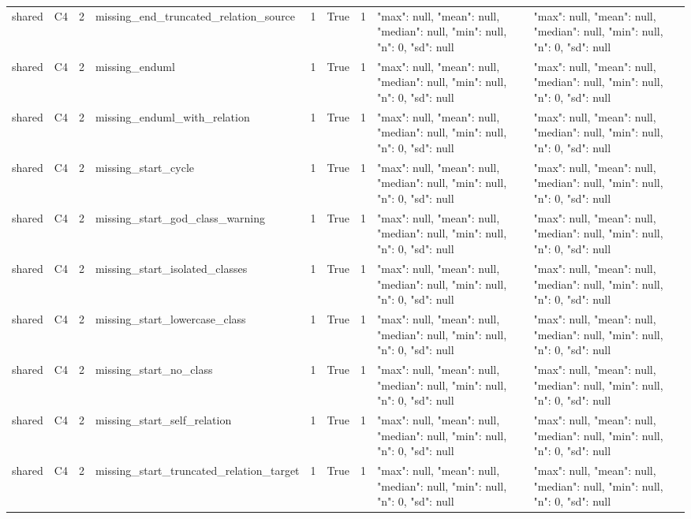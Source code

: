 \begin{tabular}{lllllllll}
shared & C4 & 2 & missing\_end\_truncated\_relation\_source & 1 & True & 1 & {"max": null, "mean": null, "median": null, "min": null, "n": 0, "sd": null} & {"max": null, "mean": null, "median": null, "min": null, "n": 0, "sd": null} \\
shared & C4 & 2 & missing\_enduml & 1 & True & 1 & {"max": null, "mean": null, "median": null, "min": null, "n": 0, "sd": null} & {"max": null, "mean": null, "median": null, "min": null, "n": 0, "sd": null} \\
shared & C4 & 2 & missing\_enduml\_with\_relation & 1 & True & 1 & {"max": null, "mean": null, "median": null, "min": null, "n": 0, "sd": null} & {"max": null, "mean": null, "median": null, "min": null, "n": 0, "sd": null} \\
shared & C4 & 2 & missing\_start\_cycle & 1 & True & 1 & {"max": null, "mean": null, "median": null, "min": null, "n": 0, "sd": null} & {"max": null, "mean": null, "median": null, "min": null, "n": 0, "sd": null} \\
shared & C4 & 2 & missing\_start\_god\_class\_warning & 1 & True & 1 & {"max": null, "mean": null, "median": null, "min": null, "n": 0, "sd": null} & {"max": null, "mean": null, "median": null, "min": null, "n": 0, "sd": null} \\
shared & C4 & 2 & missing\_start\_isolated\_classes & 1 & True & 1 & {"max": null, "mean": null, "median": null, "min": null, "n": 0, "sd": null} & {"max": null, "mean": null, "median": null, "min": null, "n": 0, "sd": null} \\
shared & C4 & 2 & missing\_start\_lowercase\_class & 1 & True & 1 & {"max": null, "mean": null, "median": null, "min": null, "n": 0, "sd": null} & {"max": null, "mean": null, "median": null, "min": null, "n": 0, "sd": null} \\
shared & C4 & 2 & missing\_start\_no\_class & 1 & True & 1 & {"max": null, "mean": null, "median": null, "min": null, "n": 0, "sd": null} & {"max": null, "mean": null, "median": null, "min": null, "n": 0, "sd": null} \\
shared & C4 & 2 & missing\_start\_self\_relation & 1 & True & 1 & {"max": null, "mean": null, "median": null, "min": null, "n": 0, "sd": null} & {"max": null, "mean": null, "median": null, "min": null, "n": 0, "sd": null} \\
shared & C4 & 2 & missing\_start\_truncated\_relation\_target & 1 & True & 1 & {"max": null, "mean": null, "median": null, "min": null, "n": 0, "sd": null} & {"max": null, "mean": null, "median": null, "min": null, "n": 0, "sd": null} \\

\end{tabular}

